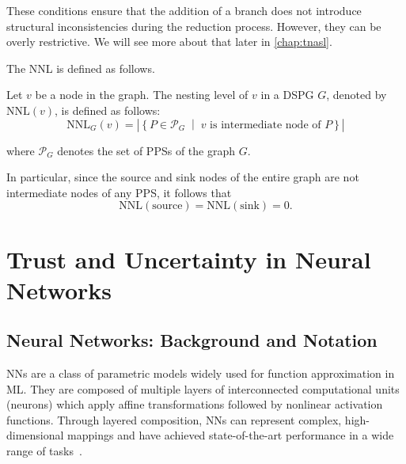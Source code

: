 These conditions ensure that the addition of a branch does not introduce structural inconsistencies during the reduction process. However, they can be overly restrictive. We will see more about that later in \cref{chap:tnasl}.


The \ac{NNL} is defined as follows.
\begin{definition}
\label{def:nnl}
Let $v$ be a node in the graph. The nesting level of $v$ in a DSPG $G$, denoted by $\mathrm{NNL}(v)$, is defined as follows:
\[
\mathrm{NNL}_G(v) = \left|
\left\{
P \in \mathcal{P}_G
\;\middle|\;
v \text{ is intermediate node of } P
\right\}
\right|
\]


where $\mathcal{P}_G$ denotes the set of \acp{PPS} of the graph \(G\).

In particular, since the source and sink nodes of the entire graph are not intermediate nodes of any \ac{PPS}, it follows that
\[
\mathrm{NNL}(\text{source}) = \mathrm{NNL}(\text{sink}) = 0.
\]
\end{definition}

\section{Trust and Uncertainty in Neural Networks}
\label{sec:trust_uq}
\subsection{Neural Networks: Background and Notation}
\label{sec:nn_background}

\acfp{NN} are a class of parametric models widely used for function approximation in \ac{ML}. They are composed of multiple layers of interconnected computational units (neurons) which apply affine transformations followed by nonlinear activation functions. Through layered composition, \acp{NN} can represent complex, high-dimensional mappings and have achieved state-of-the-art performance in a wide range of tasks~\cite{Goodfellow-et-al-2016}.

